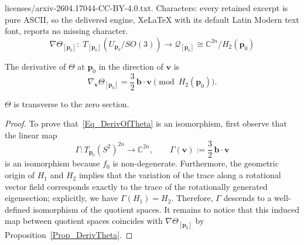 \documentclass[10pt,a4paper]{amsart}
\newcommand{\MQ}{\mathcal{Q}}
\newcommand{\mbp}{\mathbf{p}}
\newcommand{\mbv}{\mathbf{v}}
\begin{document}
licenses/arxiv-2604.17044-CC-BY-4.0.txt. Characters: every retained excerpt is pure ASCII, so the delivered engine, XeLaTeX with its default Latin Modern text font, reports no missing character.
\begin{equation}
	\label{Eq_DerivOfTheta}
	\nabla\Theta_{[\mbp_0]}:\; T_{[\mbp_0]}(U_{\mbp_0}/SO(3))
	\longrightarrow \MQ_{[\mbp_0]} \cong \mathbb{C}^{2n}/H_2(\mbp_0)
\end{equation}

\begin{proposition}
  \label{Prop_DerivTheta}
	The derivative of  $\Theta$ at $\mbp_0$ in the direction of $\mbv$ is 
	\begin{equation}
		\label{Eq_DerivOfThetaExpression}
	\nabla_\mbv\Theta_{[\mbp_0]} = \frac{3}{2}\, \mathbf{b}\cdot \mbv  \pmod{H_2 (\mbp_0)}.
	\end{equation}
\end{proposition}

\begin{corollary}\label{prop_isomorphism}
	$\Theta$ is transverse to the zero section.
\end{corollary}

\begin{proof}
  To prove that~\eqref{Eq_DerivOfTheta}  is an isomorphism, first observe that the linear map
  \[
  \Gamma: T_{\mbp_0}(S^2)^{2n} \longrightarrow \mathbb{C}^{2n},
  \qquad \Gamma(\mbv) := \frac{3}{2}\, \mathbf{b}\cdot \mbv
  \]
  is an isomorphism because $f_0$ is non-degenerate. Furthermore, the geometric origin
  of $H_1$ and $H_2$ implies that the variation of the trace along a
  rotational vector field corresponds exactly to the trace of the
  rotationally generated eigensection; explicitly, we have
  $\Gamma(H_1) = H_2$. 
  Therefore, $\Gamma$ descends to a well-defined isomorphism of the quotient
  spaces. 
  It remains to notice that this induced map between quotient spaces coincides with $\nabla\Theta_{[\mbp_0]}$ by Proposition~\ref{Prop_DerivTheta}.
\end{proof}
\end{document}
